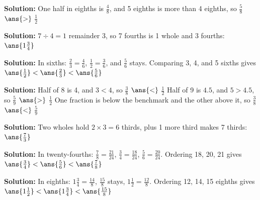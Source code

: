 \documentclass[12pt]{article}
\begin{document}



\textbf{Solution:} One half in eighths is $\tfrac{4}{8}$, and 5 eighths is
more than 4 eighths, so $\tfrac{5}{8}$ $\ans{>}$ $\tfrac{1}{2}$


\textbf{Solution:} $7 \div 4 = 1$ remainder 3, so 7 fourths is 1 whole and 3
fourths: $\ans{1\tfrac{3}{4}}$


\textbf{Solution:} In sixths: $\tfrac{2}{3} = \tfrac{4}{6}$,
$\tfrac{1}{2} = \tfrac{3}{6}$, and $\tfrac{5}{6}$ stays. Comparing 3, 4, and
5 sixths gives
$\ans{\tfrac{1}{2}} < \ans{\tfrac{2}{3}} < \ans{\tfrac{5}{6}}$


\textbf{Solution:} Half of 8 is 4, and $3 < 4$, so
$\tfrac{3}{8}$ $\ans{<}$ $\tfrac{1}{2}$
Half of 9 is $4.5$, and $5 > 4.5$, so
$\tfrac{5}{9}$ $\ans{>}$ $\tfrac{1}{2}$
One fraction is below the benchmark and the other above it, so
$\tfrac{3}{8}$ $\ans{<}$ $\tfrac{5}{9}$


\textbf{Solution:} Two wholes hold $2 \times 3 = 6$ thirds, plus 1 more
third makes 7 thirds: $\ans{\tfrac{7}{3}}$


\textbf{Solution:} In twenty-fourths: $\tfrac{7}{8} = \tfrac{21}{24}$,
$\tfrac{3}{4} = \tfrac{18}{24}$, $\tfrac{5}{6} = \tfrac{20}{24}$. Ordering
18, 20, 21 gives
$\ans{\tfrac{3}{4}} < \ans{\tfrac{5}{6}} < \ans{\tfrac{7}{8}}$


\textbf{Solution:} In eighths: $1\tfrac{3}{4} = \tfrac{14}{8}$,
$\tfrac{15}{8}$ stays, $1\tfrac{1}{2} = \tfrac{12}{8}$. Ordering 12, 14, 15
eighths gives
$\ans{1\tfrac{1}{2}} < \ans{1\tfrac{3}{4}} < \ans{\tfrac{15}{8}}$

\end{document}
